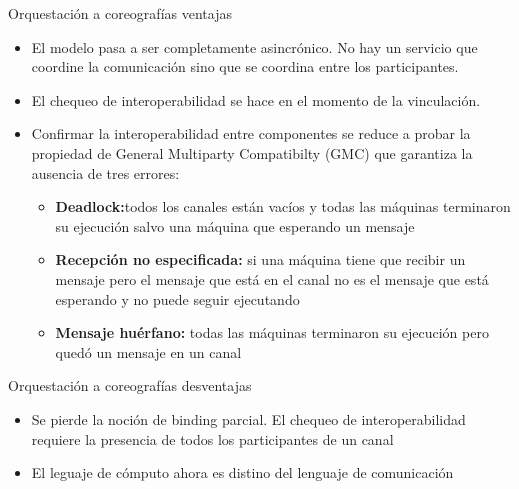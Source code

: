 \documentclass[10pt,xcolor={table,dvipsnames},t]{beamer}
\begin{document}
\begin{frame}{Orquestación a coreografías ventajas}
 \begin{itemize}
     \item El modelo pasa a ser completamente asincrónico. No hay un servicio que coordine la comunicación sino que se coordina entre los participantes.
    \item El chequeo de interoperabilidad se hace en el momento de la vinculación.
    \item Confirmar la interoperabilidad entre componentes se reduce a probar la propiedad de General Multiparty Compatibilty (GMC) que garantiza la ausencia de tres errores: \begin{itemize}
        \item \textbf{Deadlock:}todos los canales están vacíos y todas las máquinas terminaron su ejecución salvo una máquina que esperando un mensaje
        \item \textbf{Recepción no especificada:} si una máquina tiene que recibir un mensaje pero el mensaje que está en el canal no es el mensaje que está esperando y no puede seguir ejecutando
        \item \textbf{Mensaje huérfano:} todas las máquinas terminaron su ejecución pero quedó un mensaje en un canal
    \end{itemize}
 \end{itemize}
\end{frame}

\begin{frame}{Orquestación a coreografías desventajas}
 \begin{itemize}
    \item Se pierde la noción de binding parcial. El chequeo de interoperabilidad requiere la presencia de todos los participantes de un canal
    \item El leguaje de cómputo ahora es distino del lenguaje de comunicación
     \end{itemize}
\end{frame}
    
\end{document}

